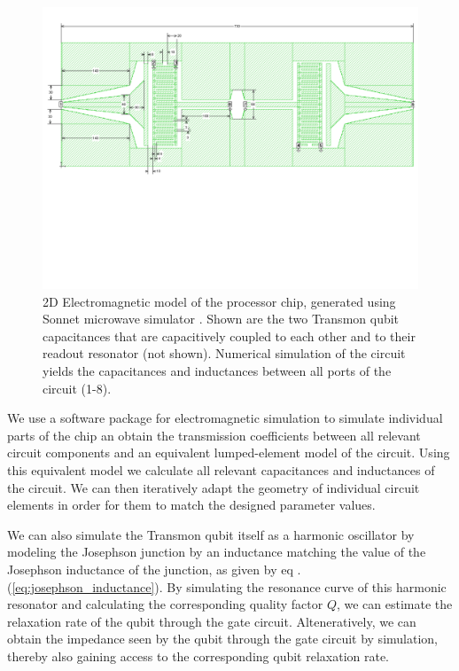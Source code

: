 \begin{figure}[ht!]
	\centering
	\includegraphics[width=\textwidth]{./material/figures/2-qubit-processor/sonnet_simulation_of_qubit_chip}
	\caption[]{2D Electromagnetic model of the processor chip, generated using Sonnet microwave simulator \citep{}. Shown are the two Transmon qubit capacitances that are capacitively coupled to each other and to their readout resonator (not shown). Numerical simulation of the circuit yields the capacitances and inductances between all ports of the circuit (1-8).}
	\label{fig:sonnet_model_of_qubit_chip}
\end{figure}

We use a software package for electromagnetic simulation \citep{} to simulate individual parts of the chip an obtain the transmission coefficients between all relevant circuit components and an equivalent lumped-element model of the circuit. Using this equivalent model we calculate all relevant capacitances and inductances of the circuit. We can then iteratively adapt the geometry of individual circuit elements in order for them to match the designed parameter values.

\smallskip

We can also simulate the Transmon qubit itself as a harmonic oscillator by modeling the Josephson junction by an inductance matching the value of the Josephson inductance of the junction, as given by eq .(\ref{eq:josephson_inductance}). By simulating the resonance curve of this harmonic resonator and calculating the corresponding quality factor $Q$, we can estimate the relaxation rate of the qubit through the gate circuit. Alteneratively, we can obtain the impedance seen by the qubit through the gate circuit by simulation, thereby also gaining access to the corresponding qubit relaxation rate.

